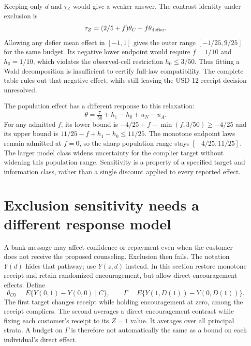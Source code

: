 Keeping only $d$ and $\tau_Z$ would give a weaker answer. The contrast
identity under exclusion is
\[
 \tau_Z=(2/5+f)\theta_C-f\theta_{\rm defier}.
\]
Allowing any defier mean effect in $[-1,1]$ gives the outer range
$[-1/25,9/25]$ for the same budget. Its negative lower endpoint
would require $f=1/10$ and $h_0=1/10$, which violates the
observed-cell restriction $h_0\leq3/50$.
Thus fitting a Wald decomposition is insufficient to certify full-law
compatibility. The complete table rules out that negative effect, while
still leaving the USD 12 receipt decision unresolved.

The population effect has a different response to this relaxation:
\[
 \theta=\tfrac7{50}+h_1-h_0+u_N-u_A.
\]
For any admitted $f$, its lower bound is
$-4/25+f-\min(f,3/50)\geq-4/25$ and its upper bound is
$11/25-f+h_1-h_0\leq11/25$.
The monotone endpoint laws remain admitted at $f=0$, so the sharp
population range stays $[-4/25,11/25]$. The larger model class
widens uncertainty for the complier target without widening this
population range. Sensitivity is a property of a specified target and
information class, rather than a single discount applied to every
reported effect.~\citep{exec17_s3_sensitivity}

\section{Exclusion sensitivity needs a different response model}
\label{exec17:s3-exclusion}

A bank message may affect confidence or repayment even when the customer
does not receive the proposed counseling. Exclusion then fails.
The notation $Y(d)$ hides that pathway; use $Y(z,d)$ instead.
In this section restore monotone receipt and retain randomized encouragement,
but allow direct encouragement effects. Define
\[
 \theta_{C0}=E\{Y(0,1)-Y(0,0)\mid C\},\qquad
 \Gamma=E\{Y(1,D(1))-Y(0,D(1))\}.
\]
The first target changes receipt while holding encouragement at zero,
among the receipt compliers. The second averages a direct encouragement
contrast while fixing each customer's receipt to its $Z=1$ value.
It averages over all principal strata. A budget on $\Gamma$ is therefore
not automatically the same as a bound on each individual's direct effect.

